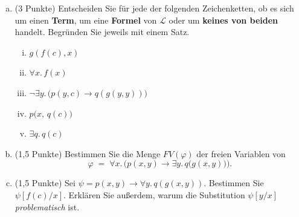 \begin{enumerate}[a)]
  \item (3 Punkte) Entscheiden Sie für jede der folgenden Zeichenketten, ob es sich um einen \textbf{Term}, um eine \textbf{Formel} von $\mathscr{L}$ oder um \textbf{keines von beiden} handelt. Begründen Sie jeweils mit einem Satz.
  \begin{enumerate}[(i)]
    \item $g(f(c), x)$
    \item $\forall x.\, f(x)$
    \item $\neg \exists y.\, \big(p(y, c) \to q(g(y,y))\big)$
    \item $p\big(x,\, q(c)\big)$
    \item $\exists q.\, q(c)$
  \end{enumerate}
  \item (1,5 Punkte) Bestimmen Sie die Menge $FV(\varphi)$ der freien Variablen von
  \[
    \varphi \;=\; \forall x.\, \Big( p(x,y) \to \exists y.\, q\big(g(x,y)\big) \Big).
  \]
  \item (1,5 Punkte) Sei $\psi = p(x,y) \to \forall y.\, q(g(x,y))$. Bestimmen Sie $\psi[f(c)/x]$. Erklären Sie außerdem, warum die Substitution $\psi[y/x]$ \emph{problematisch} ist.
\end{enumerate}

